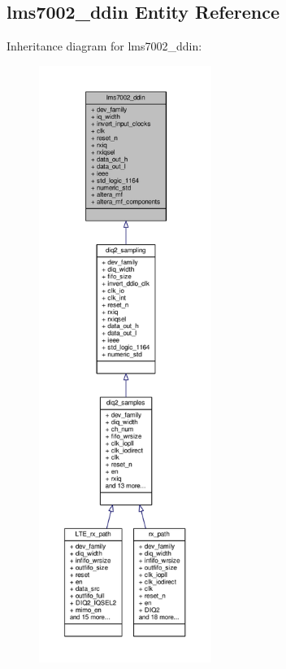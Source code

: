 \subsection{lms7002\+\_\+ddin Entity Reference}
\label{classlms7002__ddin}


Inheritance diagram for lms7002\+\_\+ddin\+:\nopagebreak
\begin{figure}[H]
\begin{center}
\leavevmode
\includegraphics[height=550pt]{dc/d7f/classlms7002__ddin__inherit__graph}
\end{center}
\end{figure}


